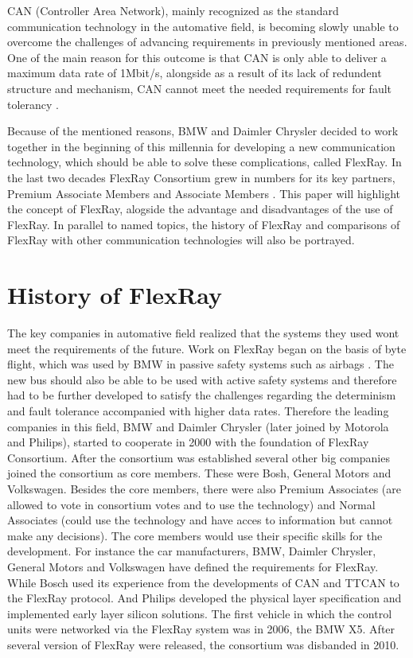 \documentclass[conference]{IEEEtran}
\begin{document}
CAN (Controller Area Network), mainly recognized as the standard communication technology in the automative field, is becoming slowly unable to overcome the challenges of advancing requirements in previously mentioned areas. One of the main reason for this outcome is that CAN is only able to deliver a maximum data rate of 1Mbit/s, alongside as a result of its lack of redundent structure and mechanism, CAN cannot meet the needed requirements for fault tolerancy \cite{makowitz2006flexray}.

Because of the mentioned reasons, BMW and Daimler Chrysler decided to work together in the beginning of this millennia for developing a new communication technology, which should be able to solve these complications, called FlexRay. In the last two decades FlexRay Consortium grew in numbers for its key partners, Premium Associate Members and Associate Members \cite{enosh2014efficient}. This paper will highlight the concept of FlexRay, alogside the advantage and disadvantages of the use of FlexRay. In parallel to named topics, the history of FlexRay and comparisons of FlexRay with other communication technologies will also be portrayed.


\section{History of FlexRay}
The key companies in automative field realized that the systems they used wont meet the requirements of the future. Work on FlexRay began on the basis of byte flight, which was used by BMW in passive safety systems such as airbags \cite{kopetz2001comparison}. The new bus should also be able to be used with active safety systems and therefore had to be further developed to satisfy the challenges regarding the determinism and fault tolerance accompanied with higher data rates. Therefore the leading companies in this field, BMW and Daimler Chrysler (later joined by Motorola and Philips), started to cooperate in 2000 with the foundation of FlexRay Consortium. After the consortium was established several other big companies joined the consortium as core members. These were Bosh, General Motors and Volkswagen. Besides the core members, there were also Premium Associates (are allowed to vote in consortium votes and to use the technology) and Normal Associates (could use the technology and have acces to information but cannot make any decisions). The core members would use their specific skills for the development. For instance the car manufacturers, BMW, Daimler Chrysler, General Motors and Volkswagen have defined the requirements for FlexRay. While Bosch used its experience from the developments of CAN and TTCAN to the FlexRay protocol. And Philips developed the physical layer specification and implemented early layer silicon solutions. The first vehicle in which the control units were networked via the FlexRay system was in 2006, the BMW X5. After several version of FlexRay were released, the consortium was disbanded in 2010.
\end{document}
